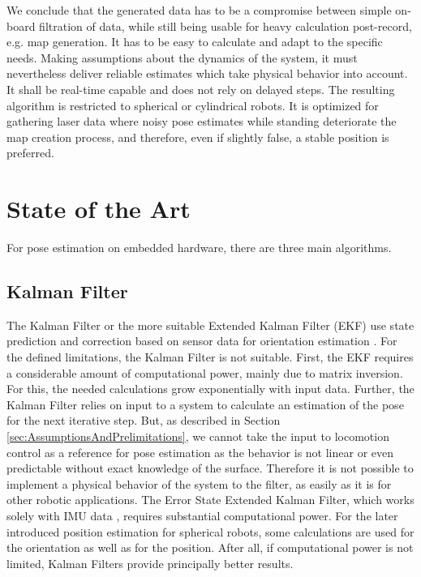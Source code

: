 \documentclass[letterpaper, 10 pt, conference]{ieeeconf}  %
\begin{document}
We conclude that the generated data has to be a compromise between simple on-board filtration of data, while still being usable for heavy calculation post-record, e.g. map generation.
It has to be easy to calculate and adapt to the specific needs.
Making assumptions about the dynamics of the system, it must nevertheless deliver reliable estimates which take physical behavior into account.
It shall be real-time capable and does not rely on delayed steps.
The resulting algorithm is restricted to spherical or cylindrical robots. 
It is optimized for gathering laser data where noisy pose estimates while standing deteriorate the map creation process, and therefore, even if slightly false, a stable position is preferred.

\section{State of the Art}
\label{sec:SOA}
For pose estimation on embedded hardware, there are three main algorithms.
\subsection{Kalman Filter}
The Kalman Filter or the more suitable Extended Kalman Filter (EKF) use state prediction and correction based on sensor data for orientation estimation \cite{Kalman1960}.
For the defined limitations, the Kalman Filter is not suitable.
First, the EKF requires a considerable amount of computational power, mainly due to matrix inversion. For this, the needed calculations grow exponentially with input data.
Further, the Kalman Filter relies on input to a system to calculate an estimation of the pose for the next iterative step.
But, as described in Section \ref{sec:AssumptionsAndPrelimitations}, we cannot take the input to locomotion control as a reference for pose estimation as the behavior is not linear or even predictable without exact knowledge of the surface.
Therefore it is not possible to implement a physical behavior of the system to the filter, as easily as it is for other robotic applications.
The Error State Extended Kalman Filter, which works solely with IMU data \cite{ahmadi2007orientation}, requires substantial computational power.
For the later introduced position estimation for spherical robots, some calculations are used for the orientation as well as for the position.
After all, if computational power is not limited, Kalman Filters provide principally better results.
\end{document}
